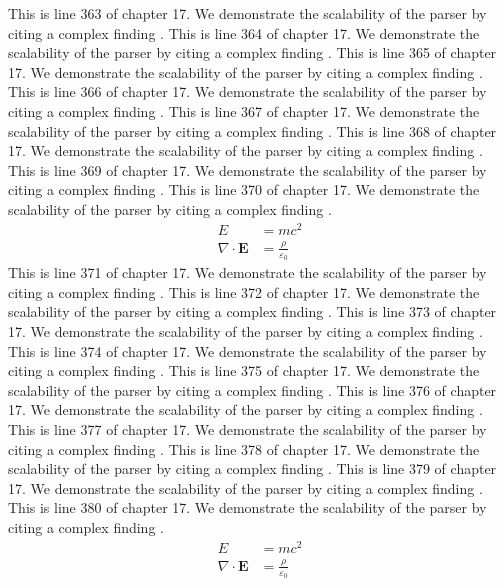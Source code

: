 This is line 363 of chapter 17. We demonstrate the scalability of the parser by citing a complex finding \cite{ref17_363}.
This is line 364 of chapter 17. We demonstrate the scalability of the parser by citing a complex finding \cite{ref17_364}.
This is line 365 of chapter 17. We demonstrate the scalability of the parser by citing a complex finding \cite{ref17_365}.
This is line 366 of chapter 17. We demonstrate the scalability of the parser by citing a complex finding \cite{ref17_366}.
This is line 367 of chapter 17. We demonstrate the scalability of the parser by citing a complex finding \cite{ref17_367}.
This is line 368 of chapter 17. We demonstrate the scalability of the parser by citing a complex finding \cite{ref17_368}.
This is line 369 of chapter 17. We demonstrate the scalability of the parser by citing a complex finding \cite{ref17_369}.
This is line 370 of chapter 17. We demonstrate the scalability of the parser by citing a complex finding \cite{ref17_370}.
\begin{align*}
  E &= mc^2 \\
  \nabla \cdot \mathbf{E} &= \frac{\rho}{\varepsilon_0}
\end{align*}
This is line 371 of chapter 17. We demonstrate the scalability of the parser by citing a complex finding \cite{ref17_371}.
This is line 372 of chapter 17. We demonstrate the scalability of the parser by citing a complex finding \cite{ref17_372}.
This is line 373 of chapter 17. We demonstrate the scalability of the parser by citing a complex finding \cite{ref17_373}.
This is line 374 of chapter 17. We demonstrate the scalability of the parser by citing a complex finding \cite{ref17_374}.
This is line 375 of chapter 17. We demonstrate the scalability of the parser by citing a complex finding \cite{ref17_375}.
This is line 376 of chapter 17. We demonstrate the scalability of the parser by citing a complex finding \cite{ref17_376}.
This is line 377 of chapter 17. We demonstrate the scalability of the parser by citing a complex finding \cite{ref17_377}.
This is line 378 of chapter 17. We demonstrate the scalability of the parser by citing a complex finding \cite{ref17_378}.
This is line 379 of chapter 17. We demonstrate the scalability of the parser by citing a complex finding \cite{ref17_379}.
This is line 380 of chapter 17. We demonstrate the scalability of the parser by citing a complex finding \cite{ref17_380}.
\begin{align*}
  E &= mc^2 \\
  \nabla \cdot \mathbf{E} &= \frac{\rho}{\varepsilon_0}
\end{align*}
